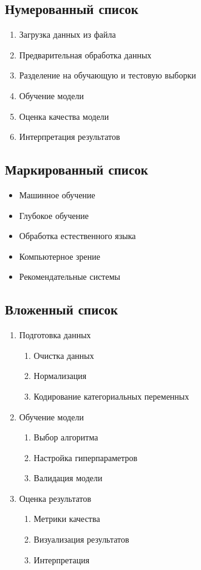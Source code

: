 \subsection{Нумерованный список}

\begin{enumerate}
\item Загрузка данных из файла
\item Предварительная обработка данных
\item Разделение на обучающую и тестовую выборки
\item Обучение модели
\item Оценка качества модели
\item Интерпретация результатов
\end{enumerate}

\subsection{Маркированный список}

\begin{itemize}
\item Машинное обучение
\item Глубокое обучение
\item Обработка естественного языка
\item Компьютерное зрение
\item Рекомендательные системы
\end{itemize}

\subsection{Вложенный список}

\begin{enumerate}
\item Подготовка данных
    \begin{enumerate}
    \item Очистка данных
    \item Нормализация
    \item Кодирование категориальных переменных
    \end{enumerate}
\item Обучение модели
    \begin{enumerate}
    \item Выбор алгоритма
    \item Настройка гиперпараметров
    \item Валидация модели
    \end{enumerate}
\item Оценка результатов
    \begin{enumerate}
    \item Метрики качества
    \item Визуализация результатов
    \item Интерпретация
    \end{enumerate}
\end{enumerate}
